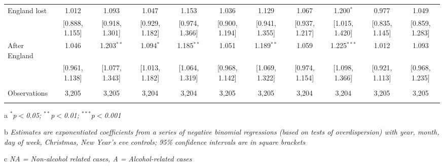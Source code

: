 \documentclass[12pt, a4paper]{article}
\begin{document}
\begin{table}
{\begin{threeparttable}
\begin{tabular}{@{\extracolsep{5pt}}lcccccccccc}
  England lost & 1.012 & 1.093 & 1.047 & 1.153 & 1.036 & 1.129 & 1.067 & 1.200$^{*}$ & 0.977 & 1.049 \\ 
  & [0.888, 1.155] & [0.918, 1.301] & [0.929, 1.182] & [0.974, 1.366] & [0.900, 1.194] & [0.941, 1.355] & [0.937, 1.217] & [1.015, 1.420] & [0.835, 1.145] & [0.859, 1.283] \\ 
  After England & 1.046 & 1.203$^{**}$ & 1.094$^{*}$ & 1.185$^{**}$ & 1.051 & 1.189$^{**}$ & 1.059 & 1.225$^{***}$ & 1.012 & 1.093 \\ 
  & [0.961, 1.138] & [1.077, 1.343] & [1.013, 1.182] & [1.064, 1.319] & [0.968, 1.142] & [1.069, 1.322] & [0.974, 1.154] & [1.098, 1.366] & [0.921, 1.113] & [0.968, 1.235] \\ 
 \hline \\[-1.8ex] 
Observations & 3,205 & 3,205 & 3,204 & 3,204 & 3,205 & 3,205 & 3,204 & 3,204 & 3,205 & 3,205 \\ 
\hline 
\hline \\[-1.8ex] 
\end{tabular} 
\begin{tablenotes}
      \item[a] \textit{$^{*}$p$<$0.05; $^{**}$p$<$0.01; $^{***}$p$<$0.001}
      \item[b] \textit{Estimates are exponentiated coefficients from a series of negative binomial regressions (based on tests of overdispersion)  with year, month, day of week, Christmas, New Year's eve controls; 95\% confidence intervals are in square brackets}
      \item[c] \textit{NA = Non-alcohol related cases, A = Alcohol-related cases}
    \end{tablenotes}
\end{threeparttable}   }
\end{table}
\end{document}
